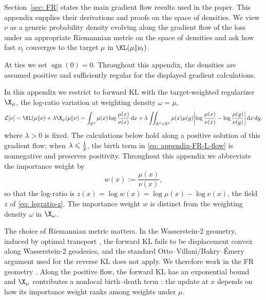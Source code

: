 \documentclass{article}
\begin{document}
Section~\ref{sec: FR} states the main gradient flow results used in the paper. This appendix supplies their derivations and proofs on the space of densities. We view $\nu$ as a generic probability density evolving along the gradient flow of the loss under an appropriate Riemannian metric on the space of densities \citep{ambrosio2008gradient,villani2009optimal} and ask how fast $\nu_t$ converges to the target $\mu$ in $\KL(\mu\|\nu_t)$.

At ties we set $\operatorname{sgn}(0)=0$. Throughout this appendix, the densities are assumed positive and sufficiently regular for the displayed gradient calculations.

In this appendix we restrict to forward KL with the target-weighted regularizer $\X_\mu$, the log-ratio variation at weighting density $\omega = \mu$,
\begin{equation}
    \mathcal L[\nu] = \KL(\mu\|\nu) + \lambda  \X_\mu(\mu\|\nu) = \int_{\mathbb R^d} \mu(x) \log \frac{\mu(x)}{\nu(x)} \D x +
    \lambda\iint_{\mathbb R^d\times\mathbb R^d}
     \mu(x)\mu(y) \biggl|\log\frac{\mu(x)}{\nu(x)} - \log\frac{\mu(y)}{\nu(y)}\biggr| \D x \D y,
    \label{eq: appendix-loss-KL-X}
\end{equation}
where $\lambda>0$ is fixed. The calculations below hold along a positive solution of this gradient flow; when $\lambda\leqslant\tfrac12$, the birth term in \eqref{eq: appendix-FR-L-flow} is nonnegative and preserves positivity.
Throughout this appendix we abbreviate the importance weight by
\begin{equation*}
    w(x) := \frac{\mu(x)}{\nu(x)},
\end{equation*}
so that the log-ratio is $z(x) = \log w(x) = \log\mu(x) - \log\nu(x)$, the field $z$ of \eqref{eq: logratio-z}. The importance weight $w$ is distinct from the weighting density $\omega$ in $\X_\omega$.

The choice of Riemannian metric matters. In the Wasserstein-2 geometry, induced by optimal transport \citep{jordan1998variational,otto2001geometry}, the forward KL fails to be displacement convex along Wasserstein-2 geodesics, and the standard Otto--Villani/Bakry--{\'E}mery argument \citep{otto2000generalization,bakry2014analysis} used for the reverse KL does not apply. We therefore work in the FR geometry \citep{amari2016information,bauer2016uniqueness}. Along the positive flow, the forward KL has an exponential bound and $\X_\mu$ contributes a nonlocal birth--death term \citep{lu2019accelerating}: the update at $x$ depends on how its importance weight ranks among weights under $\mu$.
\end{document}
